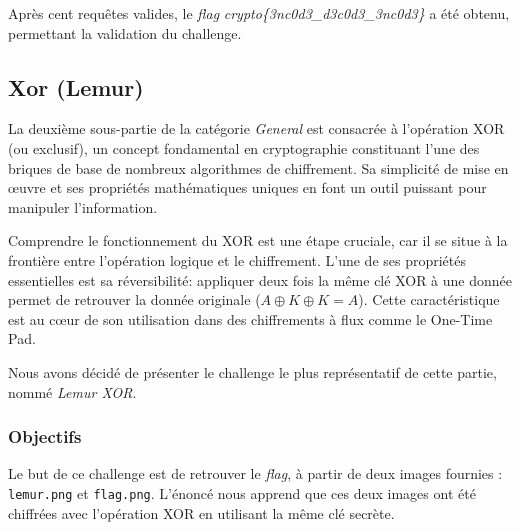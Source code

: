 Après cent requêtes valides, le \textit{flag}
\textit{crypto\{3nc0d3\_d3c0d3\_3nc0d3\}} a été obtenu, permettant la
validation du challenge.

\subsection{Xor (Lemur)}
La deuxième sous-partie de la catégorie \textit{General} est consacrée à
l'opération XOR (ou exclusif), un concept fondamental en cryptographie
constituant l'une des briques de base de nombreux algorithmes de
chiffrement. Sa simplicité de mise en œuvre et ses propriétés mathématiques
uniques en font un outil puissant pour manipuler l'information.

Comprendre le fonctionnement du XOR est une étape cruciale, car il se situe
à la frontière entre l'opération logique et le chiffrement. L'une de ses
propriétés essentielles est sa réversibilité: appliquer deux fois la même
clé XOR à une donnée permet de retrouver la donnée originale
($A \oplus K \oplus K = A$). Cette caractéristique est au cœur de son
utilisation dans des chiffrements à flux comme le One-Time Pad.

Nous avons décidé de présenter le challenge le plus représentatif de cette
partie, nommé \textit{Lemur XOR}.

\subsubsection{Objectifs}
Le but de ce challenge est de retrouver le \textit{flag}, à partir de deux
images fournies : \texttt{lemur.png} et \texttt{flag.png}. L'énoncé nous
apprend que ces deux images ont été chiffrées avec l'opération XOR en
utilisant la même clé secrète.

